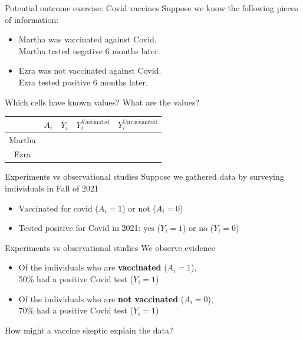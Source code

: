 \documentclass{beamer}
\begin{document}
\begin{frame}{Potential outcome exercise: Covid vaccines} \pause
Suppose we know the following pieces of information:
{\small
\begin{itemize}
\item Martha was vaccinated against Covid.\\Martha tested negative 6 months later.
\item Ezra was not vaccinated against Covid.\\Ezra tested positive 6 months later.
\end{itemize} \pause
Which cells have known values? What are the values?
}

\begin{table}
  \renewcommand*{\arraystretch}{2}
\begin{tabular}[t]{c|c|c| c|c}
  & $A_i$ & $Y_i$ & $Y_i^{\text{Vaccinated}}$ & $Y_i^{\text{Unvaccinated}}$\\
\hline
Martha & \qquad \qquad \qquad & \qquad \qquad \qquad & \qquad & \qquad\\ \hline
Ezra & \qquad \qquad & \qquad \qquad & \qquad & \qquad\\
\end{tabular}
\end{table}

\end{frame}

\begin{frame}{Experiments vs observational studies}
Suppose we gathered data by surveying individuals in Fall of 2021
    \begin{itemize}
        \item Vaccinated for covid ($A_i = 1$) or not ($A_i = 0$)
        \item Tested positive for Covid in 2021: yes ($Y_i = 1$) or no ($Y_i=0$)
     \end{itemize}
\end{frame}

\begin{frame}{Experiments vs observational studies}
We observe evidence
     \begin{itemize}
         \item Of the individuals who are \textbf{vaccinated} ($A_i = 1$),\\50\% had a positive Covid test ($Y_i = 1$)
         \item Of the individuals who are \textbf{not vaccinated} ($A_i = 0$),\\70\% had a positive Covid test ($Y_i = 1$) 
\end{itemize} \pause
How might a vaccine skeptic explain the data? 
\end{frame}
\end{document}
